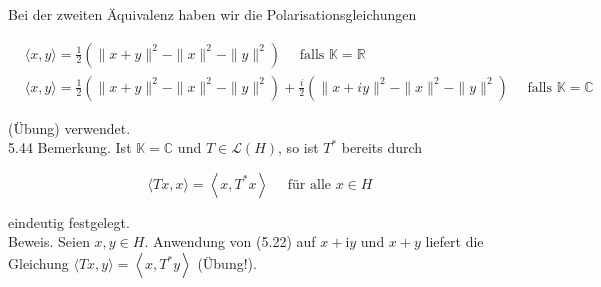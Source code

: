\documentclass[10pt, letterpaper]{article}
\begin{document}
Bei der zweiten Äquivalenz haben wir die Polarisationsgleichungen

$$
\begin{aligned}
& \langle x, y\rangle=\frac{1}{2}\left(\|x+y\|^{2}-\|x\|^{2}-\|y\|^{2}\right) \quad \text { falls } \mathbb{K}=\mathbb{R} \\
& \langle x, y\rangle=\frac{1}{2}\left(\|x+y\|^{2}-\|x\|^{2}-\|y\|^{2}\right)+\frac{i}{2}\left(\|x+i y\|^{2}-\|x\|^{2}-\|y\|^{2}\right) \quad \text { falls } \mathbb{K}=\mathbb{C}
\end{aligned}
$$

(Übung) verwendet.\\
5.44 Bemerkung. Ist $\mathbb{K}=\mathbb{C}$ und $T \in \mathcal{L}(H)$, so ist $T^{*}$ bereits durch

$$
\langle T x, x\rangle=\left\langle x, T^{*} x\right\rangle \quad \text { für alle } x \in H
$$

eindeutig festgelegt.\\
Beweis. Seien $x, y \in H$. Anwendung von (5.22) auf $x+\mathrm{i} y$ und $x+y$ liefert die Gleichung $\langle T x, y\rangle=\left\langle x, T^{*} y\right\rangle$ (Übung!).
\end{document}
